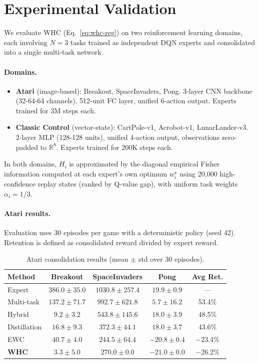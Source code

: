 \documentclass[11pt]{article}
\begin{document}
\section*{Experimental Validation}

We evaluate WHC (Eq.~\ref{eq:whc-reg}) on two reinforcement learning domains, each
involving $N=3$ tasks trained as independent DQN experts and consolidated into a single
multi-task network.

\paragraph{Domains.}
\begin{itemize}
  \item \textbf{Atari} (image-based): Breakout, SpaceInvaders, Pong.
    3-layer CNN backbone (32-64-64 channels), 512-unit FC layer, unified 6-action output.
    Experts trained for 3M steps each.
  \item \textbf{Classic Control} (vector-state): CartPole-v1, Acrobot-v1, LunarLander-v3.
    2-layer MLP (128-128 units), unified 4-action output, observations zero-padded to
    $\mathbb{R}^8$. Experts trained for 200K steps each.
\end{itemize}
In both domains, $H_i$ is approximated by the diagonal empirical Fisher information
computed at each expert's own optimum $w_i^\star$ using 20{,}000 high-confidence replay
states (ranked by Q-value gap), with uniform task weights $\alpha_i = 1/3$.

\paragraph{Atari results.}
Evaluation uses 30 episodes per game with a deterministic policy (seed 42).
Retention is defined as consolidated reward divided by expert reward.

\begin{table}[h]
\centering
\begin{tabular}{lcccc}
\toprule
\textbf{Method} & \textbf{Breakout} & \textbf{SpaceInvaders} & \textbf{Pong} & \textbf{Avg Ret.} \\
\midrule
Expert        & $386.0 \pm 35.0$  & $1030.8 \pm 257.4$ & $19.9 \pm 0.9$  & --- \\
\midrule
Multi-task    & $137.2 \pm 71.7$  & $992.7 \pm 621.8$  & $5.7 \pm 16.2$  & 53.4\% \\
Hybrid        & $9.2 \pm 3.2$     & $543.8 \pm 145.6$  & $18.0 \pm 3.9$  & 48.5\% \\
Distillation  & $16.8 \pm 9.3$    & $372.3 \pm 44.1$   & $18.0 \pm 3.7$  & 43.6\% \\
EWC           & $40.7 \pm 4.0$    & $244.5 \pm 64.4$   & $-20.8 \pm 0.4$ & $-$23.4\% \\
\textbf{WHC}  & $3.3 \pm 5.0$     & $270.0 \pm 0.0$    & $-21.0 \pm 0.0$ & $-$26.2\% \\
\bottomrule
\end{tabular}
\caption{Atari consolidation results (mean $\pm$ std over 30 episodes).}
\label{tab:atari}
\end{table}
\end{document}
